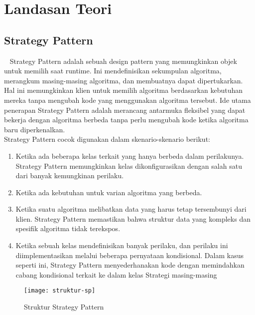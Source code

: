 \chapter{Landasan Teori}
\label{chap:teori}

\section{Strategy Pattern}
\label{sec:strategypattern}
~\cite{Gamma:94:design}
Strategy Pattern adalah sebuah design pattern yang memungkinkan objek untuk memilih saat runtime. Ini mendefinisikan sekumpulan algoritma, merangkum masing-masing algoritma, dan membuatnya dapat dipertukarkan. Hal ini memungkinkan klien untuk memilih algoritma berdasarkan kebutuhan mereka tanpa mengubah kode yang menggunakan algoritma tersebut. Ide utama penerapan Strategy Pattern adalah merancang antarmuka fleksibel yang dapat bekerja dengan algoritma berbeda tanpa perlu mengubah kode ketika algoritma baru diperkenalkan. \\
Strategy Pattern cocok digunakan dalam skenario-skenario berikut:
\begin{enumerate}
    \item Ketika ada beberapa kelas terkait yang hanya berbeda dalam perilakunya. Strategy Pattern memungkinkan kelas dikonfigurasikan dengan salah satu dari banyak kemungkinan perilaku.
    \item Ketika ada kebutuhan untuk varian algoritma yang berbeda.
    \item Ketika suatu algoritma melibatkan data yang harus tetap tersembunyi dari klien. Strategy Pattern memastikan bahwa struktur data yang kompleks dan spesifik algoritma tidak terekspos.
    \item Ketika sebuah kelas mendefinisikan banyak perilaku, dan perilaku ini diimplementasikan melalui beberapa pernyataan kondisional. Dalam kasus seperti ini, Strategy Pattern menyederhanakan kode dengan memindahkan cabang kondisional terkait ke dalam kelas Strategi masing-masing
\end{enumerate}
\begin{figure}[h] 
	\centering  
	\texttt{[image: struktur-sp]}  
	\caption{Struktur Strategy Pattern}
	\label{fig:struktursp} 
\end{figure}

